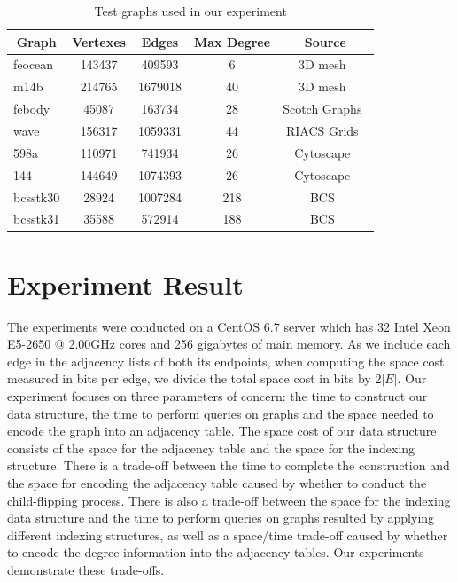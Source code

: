 \documentclass[12pt,glossary]{dalthesis}
\begin{document}
\begin{table}[ht]
\centering
\caption{ Test graphs used in our experiment }
\label{graph-list}
\begin{tabular}{|l||c|c|c|c|}
\hline
\multicolumn{1}{|c||}{Graph} & Vertexes & Edges   & Max Degree & Source        \\ \hline
feocean                   & 143437   & 409593  & 6          & 3D mesh~\cite{3DMESH}        \\
m14b                      & 214765   & 1679018 & 40         & 3D mesh~\cite{3DMESH}       \\
febody                    & 45087    & 163734  & 28         & Scotch Graphs~\cite{Scotch} \\ 
wave                      & 156317   & 1059331 & 44         & RIACS Grids~\cite{RIACS}    \\
598a                      & 110971   & 741934  & 26         & Cytoscape~\cite{Cytoscape}      \\
144                       & 144649   & 1074393 & 26         & Cytoscape~\cite{Cytoscape}     \\
bcsstk30                  & 28924    & 1007284 & 218        & BCS~\cite{Matrix}    \\
bcsstk31                  & 35588    & 572914  & 188        & BCS~\cite{Matrix}     \\ \hline
\end{tabular}
\end{table}


\section{Experiment Result} 
The experiments were conducted on a CentOS 6.7 server which has 32 Intel Xeon E5-2650 @ 2.00GHz cores and 256 gigabytes of main memory. As we include each edge in the adjacency lists of both its endpoints, when computing the space cost measured in bits per edge, we divide the total space cost in bits by $2|E|$. Our experiment focuses on three parameters of concern: the time to construct our data structure, the time to perform queries on graphs and the space needed to encode the graph into an adjacency table. The space cost of our data structure consists of the space for the adjacency table and the space for the indexing structure. There is a trade-off between the time to complete the construction and the space for encoding the adjacency table caused by whether to conduct the child-flipping process. There is also a trade-off between the space for the indexing data structure and the time to perform queries on graphs resulted by applying different indexing structures, as well as a space/time trade-off caused by whether to encode the degree information into the adjacency tables. Our experiments demonstrate these trade-offs.
\end{document}

